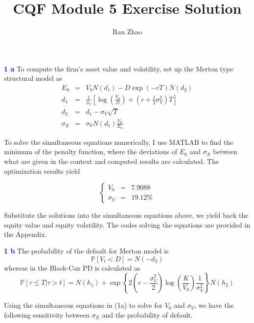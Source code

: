 \documentclass[a4paper,11pt] {article}
\author{Ran Zhao}
\title{CQF Module 5 Exercise Solution}
\date{}
\begin{document}
\maketitle


\textcolor{blue}{\bf 1 a} To compute the firm's asset value and volatility, set up the Merton type structural model as
\begin{eqnarray*}
E_0 &=& V_0  N(d_1) - D \exp (-rT) N(d_2) \\
d_1 &=& \frac{1}{\sigma_V} \left[ \log \left(\frac{V_0}{D} \right) + \left( r + \frac{1}{2}\sigma_V^2 \right) T \right] \\
d_2 &=& d_1 - \sigma_V \sqrt{T} \\
\sigma_E &=& \sigma_V N(d_1) \frac{V_0}{E_0}
\end{eqnarray*}

To solve the simultaneous equations numerically, I use MATLAB to find the minimum of the penalty function, where the deviations of $E_0$ and $\sigma_E$ between what are given in the context and computed results are calculated. The optimization results yield

$$ \left\{
\begin{aligned}
V_0 &=& 7.9088 \\
\sigma_V &=& 19.12\%
\end{aligned}
\right.
$$

Substitute the solutions into the simultaneous equations above, we yield back the equity value and equity volatility. The codes solving the equations are provided in the Appendix.

\bigskip

\textcolor{blue}{\bf 1 b} The probability of the default for Merton model is
$$
\mathbb{P}[V_t < D] = N(-d_2)
$$
whereas in the Black-Cox PD is calculated as
$$
\mathbb{P}[\tau \leq T | \tau > t] = N(h_1) + \exp\left\{ 2\left(r-\frac{\sigma_V^2}{2}\right) \log\left( \frac{K}{V_0} \right) \frac{1}{\sigma_V^2} \right\} N(h_2)
$$

Using the simultaneous equations in (1a) to solve for $V_0$ and $\sigma_V$, we have the following sensitivity between $\sigma_E$ and the probability of default.
\end{document}
